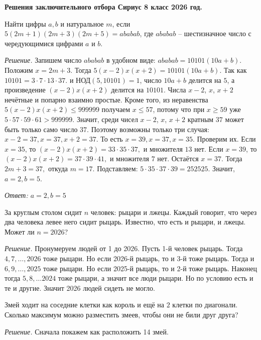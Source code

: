 \begin{center}
    {\LARGE\bfseries Решения заключительного отбора Сириус 8 класс 2026 год.}\\[2mm]
\end{center}

Найти цифры $a,b$ и натуральное $m$, если $5(2m+1)(2m+3)(2m+5)=ababab$,
где $ababab$ -- шестизначное число с чередующимися цифрами $a$ и $b$.

\textit{Решение.}
Запишем число $ababab$ в удобном виде: $ababab=10101(10a+b).$
Положим $x=2m+3.$ Тогда $5(x-2)x(x+2)=10101(10a+b).$ Так как $10101=3\cdot 7\cdot 13\cdot 37$. и $\text{НОД}(5,10101)=1$, число $10a+b$ делится на $5$, а произведение $(x-2)x(x+2)$ делится на $10101$. Числа $x-2$, $x$, $x+2$ нечётные и попарно взаимно простые. Кроме того, из неравенства $5(x-2)x(x+2)\le 999999$  получаем $x\le 57$, потому что при $x\ge 59$ уже $5\cdot 57\cdot 59\cdot 61>999999.$ Значит, среди чисел $x-2$, $x$, $x+2$ кратным $37$ может быть только само число $37$. Поэтому возможны только три случая: $x-2=37,x=37, x+2=37.$ То есть $x=39, x=37, x=35.$ Проверим их. Если $x=35$, то $(x-2)x(x+2)=33\cdot 35\cdot 37,$ и множителя $13$ нет. Если $x=39$, то $(x-2)x(x+2)=37\cdot 39\cdot 41,$ и множителя $7$ нет. Остаётся $x=37.$ Тогда $2m+3=37,$ откуда $m=17.$ Подставляем: $5\cdot 35\cdot 37\cdot 39=252525.$ Значит, $a=2, b=5.$

\textit{Ответ: $a = 2, b = 5$}

За круглым столом сидит $n$ человек: рыцари и лжецы. Каждый говорит, что через два человека левее него сидит рыцарь. Известно, что есть и рыцари, и лжецы. Может ли $n=2026$?

\textit{Решение.}
Пронумеруем людей от 1 до 2026. Пусть 1-й человек рыцарь. Тогда \\ $4, 7, \ldots, 2026$ тоже рыцари. Но если 2026-й рыцарь, то и 3-й тоже рыцарь. Тогда и $6, 9, \ldots, 2025$ тоже рыцари. Но если 2025-й рыцарь, то и 2-й тоже рыцарь. Наконец тогда $5, 8, \ldots 2024$ тоже рыцари, а значит все люди рыцари. Но по условию есть и те и другие. Значит 2026 людей сидеть не могло.

Змей ходит на соседние клетки как король и ещё на $2$ клетки по диагонали. Сколько максимум можно разместить змеев, чтобы они не били друг друга?

\newpage

\hspace{3mm}

\textit{Решение.} Сначала покажем как расположить 14 змей.

